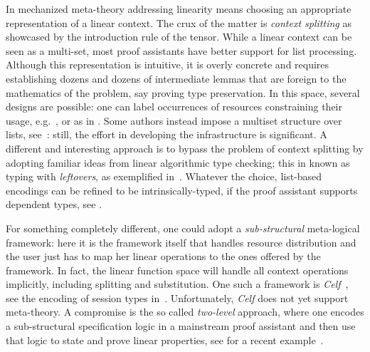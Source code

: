 
In mechanized meta-theory addressing linearity means choosing an
appropriate representation of a linear context. The crux of the matter
is \emph{context splitting} as showcased by the introduction rule of
the tensor. While a linear context can be seen as a multi-set, most
proof assistants have better support for list processing.  Although
this representation is intuitive, it is overly concrete and requires
establishing dozens and dozens of intermediate lemmas that are foreign
to the mathematics of the problem, say proving type preservation. In
this space, several designs are possible: one can label occurrences of
resources constraining their usage, e.g.~\cite{CicconeP20}, or
 as in \cite{Castro2020}. Some authors
instead impose a multiset structure over lists,
see~\cite{ChaudhuriLR19,Danielsson12}: still, the effort in developing
the infrastructure is significant. A different and interesting
approach is to bypass the problem of context splitting by adopting
familiar ideas from linear algorithmic  type checking;
this in known as typing with \emph{leftovers}, as
exemplified in~\cite{DBLP:conf/forte/ZalakainD21}. Whatever the choice,
list-based encodings can be refined to be intrinsically-typed, if the proof assistant supports dependent types, see \cite{Thiemann2019,CicconeP20,RouvoetPKV20}.

For something completely different, one could adopt a
\emph{sub-structural} meta-logical framework: here it is the framework
itself that handles resource distribution and the user just has to map
her linear operations to the ones offered by the framework. In fact,
the linear function space will handle all context operations
implicitly, including splitting and substitution. One such a framework
is \emph{Celf}~\cite{Schack-Nielsen:IJCAR08}, see the encoding of
session types in~\cite{Bock2016}. Unfortunately, \emph{Celf} does not
yet support meta-theory. A compromise is the so called
\emph{two-level} approach, where one encodes a sub-structural
specification logic in a mainstream proof assistant and then use that
logic to state and prove linear properties, see for a recent
example~\cite{Felty:MSCS21}.



